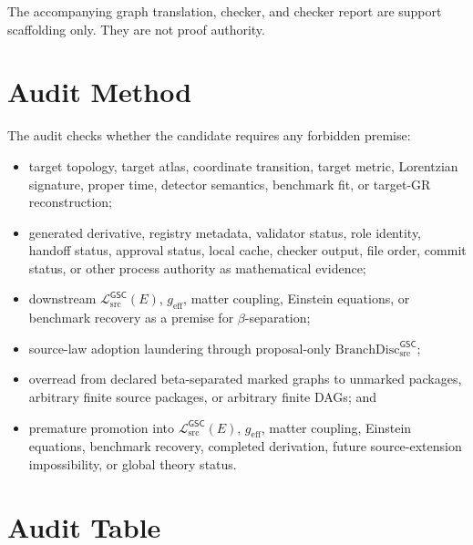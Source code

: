 \documentclass[11pt]{article}
\newcommand{\MetricData}{\mathcal{L}_{\mathrm{src}}^{\mathsf{GSC}}}
\newcommand{\geff}{g_{\mathrm{eff}}}
\newcommand{\BranchDisc}{\mathrm{BranchDisc}_{\mathrm{src}}^{\mathsf{GSC}}}
\begin{document}
The accompanying graph translation, checker, and checker report are support
scaffolding only. They are not proof authority.

\section{Audit Method}

The audit checks whether the candidate requires any forbidden premise:
\begin{itemize}[leftmargin=*]
  \item target topology, target atlas, coordinate transition, target metric,
  Lorentzian signature, proper time, detector semantics, benchmark fit, or
  target-GR reconstruction;
  \item generated derivative, registry metadata, validator status, role
  identity, handoff status, approval status, local cache, checker output, file
  order, commit status, or other process authority as mathematical evidence;
  \item downstream \(\MetricData(E)\), \(\geff\), matter coupling, Einstein
  equations, or benchmark recovery as a premise for \(\beta\)-separation;
  \item source-law adoption laundering through proposal-only \(\BranchDisc\);
  \item overread from declared beta-separated marked graphs to unmarked
  packages, arbitrary finite source packages, or arbitrary finite DAGs; and
  \item premature promotion into \(\MetricData(E)\), \(\geff\), matter
  coupling, Einstein equations, benchmark recovery, completed derivation,
  future source-extension impossibility, or global theory status.
\end{itemize}

\section{Audit Table}
\end{document}
